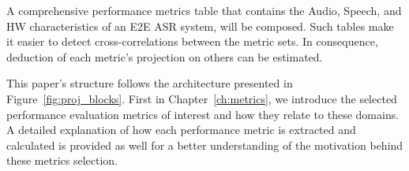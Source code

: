 A comprehensive performance metrics table that contains the Audio,
Speech, and HW characteristics
of an E2E ASR system, will be composed.
Such tables make it easier to detect cross-correlations between the metric sets.
In consequence, 
deduction of each metric's
projection on others can be estimated.

This paper's structure follows the architecture
presented in Figure~\ref{fig:proj_blocks}.
First in Chapter~\ref{ch:metrics}, 
we introduce the selected performance evaluation metrics
of interest and how they relate to these domains. 
A detailed explanation of how each performance metric is
extracted and calculated is provided as well
for a better understanding of the motivation behind
these metrics selection.
